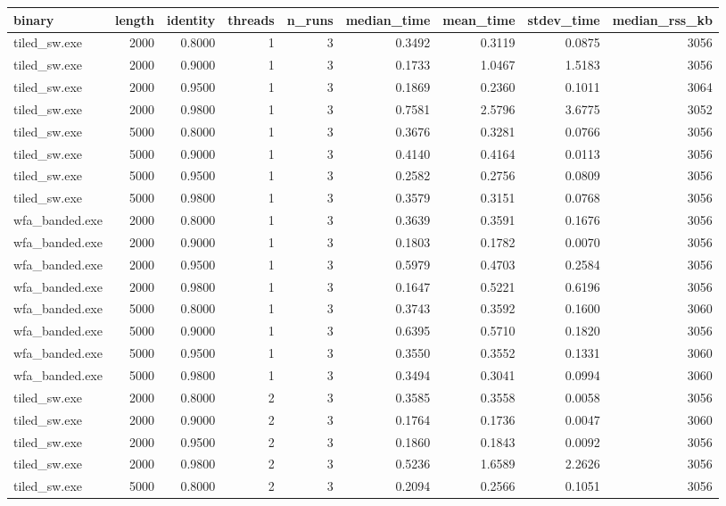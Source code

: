 \begin{tabular}{lrrrrrrrr}
\toprule
binary & length & identity & threads & n_runs & median_time & mean_time & stdev_time & median_rss_kb \\
\midrule
tiled_sw.exe & 2000 & 0.8000 & 1 & 3 & 0.3492 & 0.3119 & 0.0875 & 3056 \\
tiled_sw.exe & 2000 & 0.9000 & 1 & 3 & 0.1733 & 1.0467 & 1.5183 & 3056 \\
tiled_sw.exe & 2000 & 0.9500 & 1 & 3 & 0.1869 & 0.2360 & 0.1011 & 3064 \\
tiled_sw.exe & 2000 & 0.9800 & 1 & 3 & 0.7581 & 2.5796 & 3.6775 & 3052 \\
tiled_sw.exe & 5000 & 0.8000 & 1 & 3 & 0.3676 & 0.3281 & 0.0766 & 3056 \\
tiled_sw.exe & 5000 & 0.9000 & 1 & 3 & 0.4140 & 0.4164 & 0.0113 & 3056 \\
tiled_sw.exe & 5000 & 0.9500 & 1 & 3 & 0.2582 & 0.2756 & 0.0809 & 3056 \\
tiled_sw.exe & 5000 & 0.9800 & 1 & 3 & 0.3579 & 0.3151 & 0.0768 & 3056 \\
wfa_banded.exe & 2000 & 0.8000 & 1 & 3 & 0.3639 & 0.3591 & 0.1676 & 3056 \\
wfa_banded.exe & 2000 & 0.9000 & 1 & 3 & 0.1803 & 0.1782 & 0.0070 & 3056 \\
wfa_banded.exe & 2000 & 0.9500 & 1 & 3 & 0.5979 & 0.4703 & 0.2584 & 3056 \\
wfa_banded.exe & 2000 & 0.9800 & 1 & 3 & 0.1647 & 0.5221 & 0.6196 & 3056 \\
wfa_banded.exe & 5000 & 0.8000 & 1 & 3 & 0.3743 & 0.3592 & 0.1600 & 3060 \\
wfa_banded.exe & 5000 & 0.9000 & 1 & 3 & 0.6395 & 0.5710 & 0.1820 & 3056 \\
wfa_banded.exe & 5000 & 0.9500 & 1 & 3 & 0.3550 & 0.3552 & 0.1331 & 3060 \\
wfa_banded.exe & 5000 & 0.9800 & 1 & 3 & 0.3494 & 0.3041 & 0.0994 & 3060 \\
tiled_sw.exe & 2000 & 0.8000 & 2 & 3 & 0.3585 & 0.3558 & 0.0058 & 3056 \\
tiled_sw.exe & 2000 & 0.9000 & 2 & 3 & 0.1764 & 0.1736 & 0.0047 & 3060 \\
tiled_sw.exe & 2000 & 0.9500 & 2 & 3 & 0.1860 & 0.1843 & 0.0092 & 3056 \\
tiled_sw.exe & 2000 & 0.9800 & 2 & 3 & 0.5236 & 1.6589 & 2.2626 & 3056 \\
tiled_sw.exe & 5000 & 0.8000 & 2 & 3 & 0.2094 & 0.2566 & 0.1051 & 3056 \\

\end{tabular}
